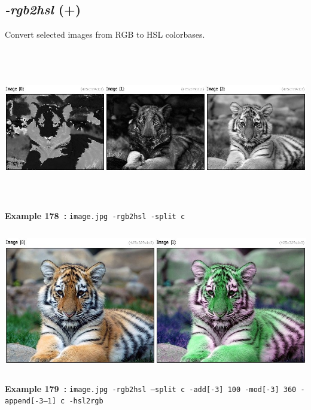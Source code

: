 \documentclass[a4paper,11pt,twoside]{book}
\begin{document}
\subsection{\emph{-rgb2hsl} (+)}\vspace*{-0.5em}
Convert selected images from RGB to HSL colorbases.
\begin{center}\includegraphics[keepaspectratio=true,height=7cm,width=\textwidth]{img/gmic_def178.jpg}\\
{\footnotesize \textbf{Example 178~:} \texttt{image.jpg -rgb2hsl -split c}}
\\\includegraphics[keepaspectratio=true,height=7cm,width=\textwidth]{img/gmic_def179.jpg}\\
{\footnotesize \textbf{Example 179~:} \texttt{image.jpg -rgb2hsl --split c -add[-3] 100 -mod[-3] 360 -append[-3--1] c -hsl2rgb}}
\end{center}
\end{document}
